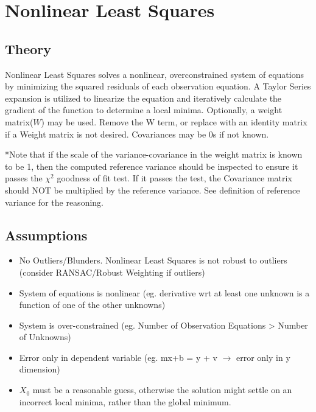 \section{Nonlinear Least Squares}
\subsection{Theory}
Nonlinear Least Squares solves a nonlinear, overconstrained system of equations by minimizing the squared residuals of each observation equation.  A Taylor Series expansion is utilized to linearize the equation and iteratively calculate the gradient of the function to determine a local minima.  Optionally, a weight matrix($W$) may be used.  Remove the W term, or replace with an identity matrix if a Weight matrix is not desired.  Covariances may be 0s if not known.

*Note that if the scale of the variance-covariance in the weight matrix is known to be 1, then the computed reference variance should be inspected to ensure it passes the $\chi^2$ goodness of fit test.  If it passes the test, the Covariance matrix should NOT be multiplied by the reference variance.  See definition of reference variance for the reasoning.

\subsection{Assumptions}
\begin{itemize}
	\item No Outliers/Blunders. Nonlinear Least Squares is not robust to outliers (consider RANSAC/Robust Weighting if outliers)
	\item System of equations is nonlinear (eg. derivative wrt at least one unknown is a function of one of the other unknowns)
	\item System is over-constrained (eg. Number of Observation Equations > Number of Unknowns)
	\item Error only in dependent variable (eg. mx+b = y + v $\rightarrow$ error only in y dimension)
	\item $X_0$ must be a reasonable guess, otherwise the solution might settle on an incorrect local minima, rather than the global minimum.	
\end{itemize}
